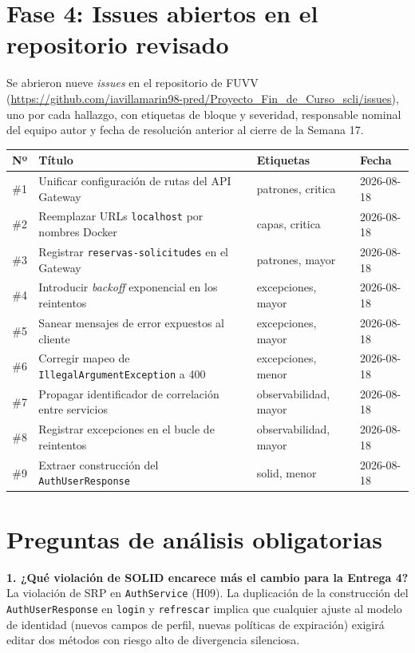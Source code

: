\documentclass[11pt,a4paper]{article}
\begin{document}
\section{Fase 4: Issues abiertos en el repositorio revisado}

Se abrieron nueve \emph{issues} en el repositorio de FUVV
(\url{https://github.com/iavillamarin98-pred/Proyecto_Fin_de_Curso_scli/issues}),
uno por cada hallazgo, con etiquetas de bloque y severidad, responsable
nominal del equipo autor y fecha de resolución anterior al cierre de la
Semana 17.

\begin{center}
\small
\begin{tabular}{c l l l}
\toprule
\textbf{Nº} & \textbf{Título} & \textbf{Etiquetas} & \textbf{Fecha} \\
\midrule
\#1 & Unificar configuración de rutas del API Gateway & patrones, critica & 2026-08-18 \\
\#2 & Reemplazar URLs \texttt{localhost} por nombres Docker & capas, critica & 2026-08-18 \\
\#3 & Registrar \texttt{reservas-solicitudes} en el Gateway & patrones, mayor & 2026-08-18 \\
\#4 & Introducir \emph{backoff} exponencial en los reintentos & excepciones, mayor & 2026-08-18 \\
\#5 & Sanear mensajes de error expuestos al cliente & excepciones, mayor & 2026-08-18 \\
\#6 & Corregir mapeo de \texttt{IllegalArgumentException} a 400 & excepciones, menor & 2026-08-18 \\
\#7 & Propagar identificador de correlación entre servicios & observabilidad, mayor & 2026-08-18 \\
\#8 & Registrar excepciones en el bucle de reintentos & observabilidad, mayor & 2026-08-18 \\
\#9 & Extraer construcción del \texttt{AuthUserResponse} & solid, menor & 2026-08-18 \\
\bottomrule
\end{tabular}
\end{center}

\section{Preguntas de análisis obligatorias}

\textbf{1. ¿Qué violación de SOLID encarece más el cambio para la Entrega 4?}
La violación de SRP en \texttt{AuthService} (H09). La duplicación de la
construcción del \texttt{AuthUserResponse} en \texttt{login} y
\texttt{refrescar} implica que cualquier ajuste al modelo de identidad
(nuevos campos de perfil, nuevas políticas de expiración) exigirá editar
dos métodos con riesgo alto de divergencia silenciosa.
\end{document}
